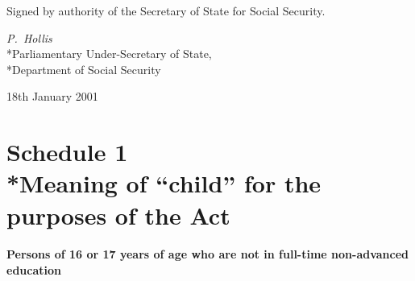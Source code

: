 \documentclass[12pt,a4paper]{article}
\begin{document}
\bigskip

Signed 
by authority of the Secretary of State for Social Security.

{\raggedleft
\emph{P.~Hollis}\\*Parliamentary Under-Secretary of State,\\*Department of Social Security

}

18th January 2001

\small

\part[Schedule 1 --- Meaning of “child” for the purposes of the Act]{Schedule 1\\*Meaning of “child” for the purposes of the Act}

\renewcommand\parthead{--- Schedule 1}

\subsection*{Persons of 16 or 17 years of age who are not in full-time non-advanced education}
\end{document}
